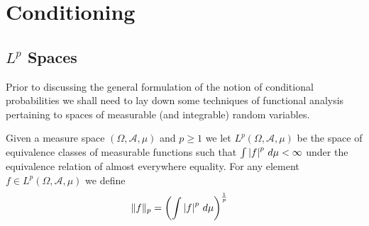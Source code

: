 \chapter{Conditioning}

\section{$L^p$ Spaces}
Prior to discussing the general formulation of the notion of
conditional probabilities we shall need to lay down some techniques of
functional analysis pertaining to spaces of measurable (and
integrable) random variables.

\begin{defn}Given a measure space $(\Omega, \mathcal{A}, \mu)$ and $p
  \geq 1$ we let $L^p(\Omega, \mathcal{A}, \mu)$ be the space of equivalence
  classes of measurable functions such that $\int \left \vert f \right \vert^p \, d\mu <
  \infty$ under the equivalence relation of
  almost everywhere equality.  For any element $f \in   L^p(\Omega,
  \mathcal{A}, \mu)$ we define 
\begin{align*}
\lVert f \rVert_p &= \left ( \int \left \vert f \right \vert^p \, d\mu \right )^{\frac{1}{p}}
\end{align*}
\end{defn}

